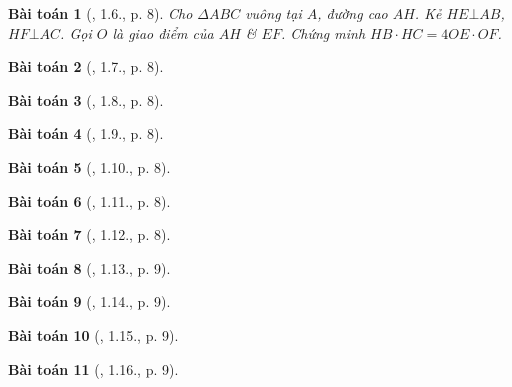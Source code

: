 \documentclass{article}
\newtheorem{baitoan}{Bài toán}
\begin{document}
\begin{baitoan}[\cite{TLCT_THCS_Toan_9_hinh_hoc}, 1.6., p. 8]
	Cho $\Delta ABC$ vuông tại $A$, đường cao $AH$. Kẻ $HE\bot AB$, $HF\bot AC$. Gọi $O$ là giao điểm của $AH$ \& $EF$. Chứng minh $HB\cdot HC = 4OE\cdot OF$.
\end{baitoan}

\begin{baitoan}[\cite{TLCT_THCS_Toan_9_hinh_hoc}, 1.7., p. 8]
	
\end{baitoan}

\begin{baitoan}[\cite{TLCT_THCS_Toan_9_hinh_hoc}, 1.8., p. 8]
	
\end{baitoan}

\begin{baitoan}[\cite{TLCT_THCS_Toan_9_hinh_hoc}, 1.9., p. 8]
	
\end{baitoan}

\begin{baitoan}[\cite{TLCT_THCS_Toan_9_hinh_hoc}, 1.10., p. 8]
	
\end{baitoan}

\begin{baitoan}[\cite{TLCT_THCS_Toan_9_hinh_hoc}, 1.11., p. 8]
	
\end{baitoan}

\begin{baitoan}[\cite{TLCT_THCS_Toan_9_hinh_hoc}, 1.12., p. 8]
	
\end{baitoan}

\begin{baitoan}[\cite{TLCT_THCS_Toan_9_hinh_hoc}, 1.13., p. 9]
	
\end{baitoan}

\begin{baitoan}[\cite{TLCT_THCS_Toan_9_hinh_hoc}, 1.14., p. 9]
	
\end{baitoan}

\begin{baitoan}[\cite{TLCT_THCS_Toan_9_hinh_hoc}, 1.15., p. 9]
	
\end{baitoan}

\begin{baitoan}[\cite{TLCT_THCS_Toan_9_hinh_hoc}, 1.16., p. 9]
	
\end{baitoan}
\end{document}
